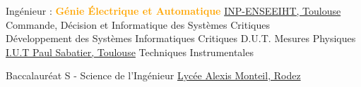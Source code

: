 \documentclass[
	a4paper,
	subsectioncolor=cvblue!70,
]{fortysecondscv}
\newcommand{\hl}[1]{\textbf{\textcolor{orange}{#1}}}
\begin{document}
\makefrontsidebar

\begin{cvtable}[1.5]
         {Ingénieur : \hl{Génie Électrique et Automatique}}
         {\href{http://www.enseeiht.fr/fr/index.html}{INP-ENSEEIHT, Toulouse}}
         {
           Commande, Décision et Informatique des Systèmes Critiques\\
           Développement des Systèmes Informatiques Critiques
         }
         {D.U.T. Mesures Physiques}
         {\href{http://iut-meph.ups-tlse.fr/}{I.U.T Paul Sabatier, Toulouse}}
         {
           Techniques Instrumentales
         }

         {Baccalauréat S - Science de l'Ingénieur}
         {\href{http://alexis-monteil.entmip.fr/}{Lycée Alexis Monteil, Rodez}}
         { }
\end{cvtable}
\end{document}
